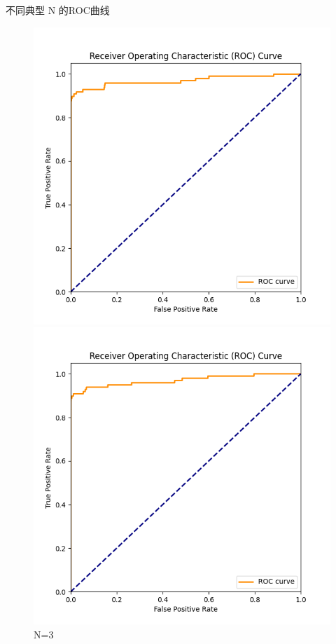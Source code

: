 \documentclass[8pt]{article}
\begin{document}
不同典型 N 的ROC曲线
\begin{figure}[H]
    \centering
    \begin{minipage}{0.24\textwidth}
        \centering
        \includegraphics[width=\textwidth]{../Prob1/out/rand_seed_14/task3/roc_curve_N_3_K_7.png}
        \caption{N=3}
        \label{fig:roc_curve_N_3_K_7}
    \end{minipage}
    \begin{minipage}{0.24\textwidth}
        \centering
        \includegraphics[width=\textwidth]{../Prob1/out/rand_seed_14/task3/roc_curve_N_7_K_7.png}

\end{minipage}
\end{figure}
\end{document}

